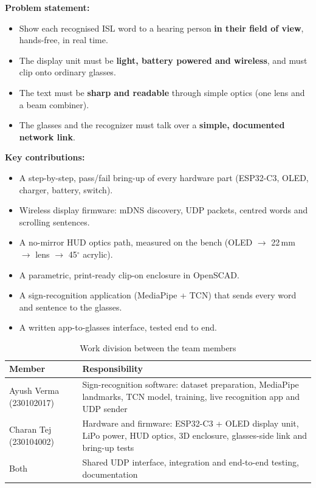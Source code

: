 \documentclass[12pt,a4paper]{report}
\begin{document}
\textbf{Problem statement:}
\begin{itemize}
  \item Show each recognised ISL word to a hearing person \textbf{in their field of view}, hands-free, in real time.
  \item The display unit must be \textbf{light, battery powered and wireless}, and must clip onto ordinary glasses.
  \item The text must be \textbf{sharp and readable} through simple optics (one lens and a beam combiner).
  \item The glasses and the recognizer must talk over a \textbf{simple, documented network link}.
\end{itemize}

\textbf{Key contributions:}
\begin{itemize}
  \item A step-by-step, pass/fail bring-up of every hardware part (ESP32-C3, OLED, charger, battery, switch).
  \item Wireless display firmware: mDNS discovery, UDP packets, centred words and scrolling sentences.
  \item A no-mirror HUD optics path, measured on the bench (OLED $\rightarrow$ 22\,mm $\rightarrow$ lens $\rightarrow$ 45$^\circ$ acrylic).
  \item A parametric, print-ready clip-on enclosure in OpenSCAD.
  \item A sign-recognition application (MediaPipe + TCN) that sends every word and sentence to the glasses.
  \item A written app-to-glasses interface, tested end to end.
\end{itemize}

\begin{table}[H]
\centering
\caption{Work division between the team members}
\label{tab:division}
\begin{tabularx}{\linewidth}{L{3.2cm} X}
\toprule
\textbf{Member} & \textbf{Responsibility} \\
\midrule
Ayush Verma (230102017) & Sign-recognition software: dataset preparation, MediaPipe landmarks, TCN model, training, live recognition app and UDP sender \cite{sib} \\
Charan Tej (230104002) & Hardware and firmware: ESP32-C3 + OLED display unit, LiPo power, HUD optics, 3D enclosure, glasses-side link and bring-up tests \\
Both & Shared UDP interface, integration and end-to-end testing, documentation \\
\bottomrule
\end{tabularx}
\end{table}
\end{document}
